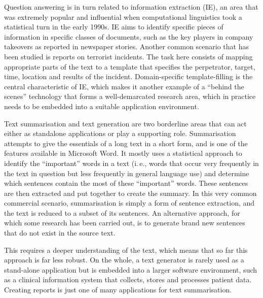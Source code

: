 \begin{multicols}{2}

Question answering is in turn related to information extraction (IE), an area that was extremely popular and influential when computational linguistics took a statistical turn in the early 1990s. IE aims to identify specific pieces of information in specific classes of documents, such as the key players in company takeovers as reported in newspaper stories. Another common scenario that has been studied is reports on terrorist incidents. The task here consists of mapping appropriate parts of the text to a template that specifies the perpetrator, target, time, location and results of the incident. Domain-specific template-filling is the central characteristic of IE, which makes it another example of a “behind the scenes” technology that forms a well-demarcated research area, which in practice needs to be embedded into a suitable application environment. 

    Text summarisation and text generation are two borderline areas that can act either as standalone applications or play a supporting role. Summarisation attempts to give the essentials of a long text in a short form, and is one of the features available in Microsoft Word. It mostly uses a statistical approach to identify the “important” words in a text (i.\,e., words that occur very frequently in the text in question but less frequently in general language use) and determine which sentences contain the most of these “important” words. These sentences are then extracted and put together to create the summary. In this very common commercial scenario, summarisation is simply a form of sentence extraction, and the text is reduced to a subset of its sentences. An alternative approach, for which some research has been carried out, is to generate brand new sentences that do not exist in the source text. 


This requires a deeper understanding of the text, which means that so far this approach is far less robust. On the whole, a text generator is rarely used as a stand-alone application but is embedded into a larger software environment, such as a clinical information system that collects, stores and processes patient data. Creating reports is just one of many applications for text summarisation. 


\end{multicols}
